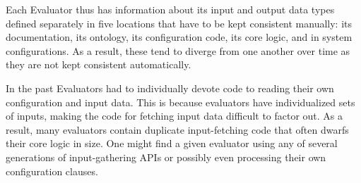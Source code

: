 \documentclass{elsart}
\begin{document}
Each Evaluator thus has information about its input and output data types defined separately in five locations that have to be kept consistent manually:  its documentation, its ontology, its configuration code, its core logic, and in system configurations.  As a result, these tend to diverge from one another over time as they are not kept consistent automatically.

In the past Evaluators had to individually devote code to reading their own configuration and input data.  This is because evaluators have individualized sets of inputs, making the code for fetching input data difficult to factor out.  As a result, many evaluators contain duplicate input-fetching code that often dwarfs their core logic in size.  One might find a given evaluator using any of several generations of input-gathering APIs or possibly even processing their own configuration clauses.
\end{document}
